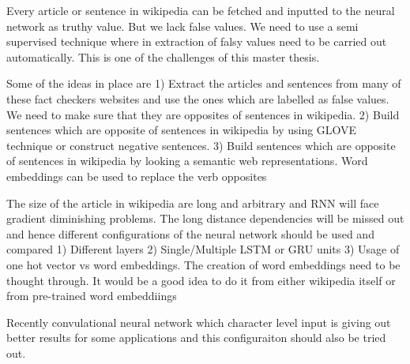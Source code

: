 \documentclass[a4paper, 11pt]{article}
\begin{document}
Every article or sentence in wikipedia can be fetched and inputted to the neural network as truthy value. But we lack false values. We need to use a semi supervised technique where in extraction of falsy values need to be carried out automatically. This is one of the challenges of this master thesis. 

Some of the ideas in place are
1) Extract the articles and sentences from many of these fact checkers websites and use the ones which are labelled as false values. We need to make sure that they are opposites of sentences in wikipedia.
2) Build sentences which are opposite of sentences in wikipedia by using GLOVE technique or construct negative sentences. 
3) Build sentences which are opposite of sentences in wikipedia by looking a semantic web representations. Word embeddings can be used to replace the verb opposites 

The size of the article in wikipedia are long and arbitrary and RNN will face gradient diminishing problems. The long distance dependencies will be missed out and hence different configurations of the neural network should be used and compared 
1) Different layers
2) Single/Multiple LSTM or GRU units
3) Usage of one hot vector vs word embeddings. The creation of word embeddings need to be thought through. It would be a good idea to do it from either wikipedia itself or from pre-trained word embeddiings


Recently convulational neural network which character level input is giving out better results for some applications and this configuraiton should also be tried out.




\end{document}
